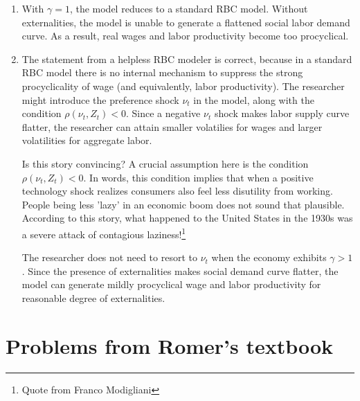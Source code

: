 \documentclass[11pt]{amsart}
\begin{document}
\begin{enumerate}[label=(\alph*)]
	\item With $\gamma = 1$, the model reduces to a standard RBC model. Without externalities, the model is unable to generate a flattened social labor demand curve. As a result, real wages and labor productivity become too procyclical. 
	
	\item The statement from a helpless RBC modeler is correct, because in a standard RBC model there is no internal mechanism to suppress the strong procyclicality of wage (and equivalently, labor productivity). The researcher might introduce the preference shock $\nu_t$ in the model, along with the condition $\rho (\nu_t, Z_t) < 0$. Since a negative $\nu_t$ shock makes labor supply curve flatter, the researcher can attain smaller volatilies for wages and larger volatilities for aggregate labor. 
	
	Is this story convincing? A crucial assumption here is the condition $\rho (\nu_t, Z_t) < 0$. In words, this condition implies that when a positive technology shock realizes consumers also feel less disutility from working. People being less 'lazy' in an economic boom does not sound that plausible. According to this story, what happened to the United States in the 1930s was a severe attack of contagious laziness!\footnote{Quote from Franco Modigliani}
	
	The researcher does not need to resort to $\nu_t$ when the economy exhibits $\gamma > 1$. Since the presence of externalities makes social demand curve flatter, the model can generate mildly procyclical wage and labor productivity for reasonable degree of externalities. 
	
	
\end{enumerate}
\section{Problems from Romer's textbook}
\end{document}
